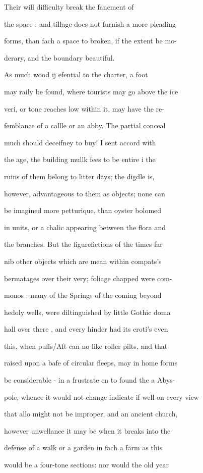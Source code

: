\documentclass{article}
\begin{document}
Their will difficulty break the fanement of

the space : and tillage does not furnish a more pleading

forms, than fach a space to broken, if the extent be mo-

derary, and the boundary beautiful.

As much wood ij efential to the charter, a foot

may raily be found, where tourists may go above the ice

veri, or tone reaches low within it, may have the re-

femblance of a callle or an abby. The partial conceal

much should deceifney to buy! I sent accord with

the age, the building mullk fees to be entire i the

ruins of them belong to litter days; the digdle is,

however, advantageous to them as objects; none can

be imagined more petturique, than oyster bolomed

in units, or a chalic appearing between the flora and

the branches. But the figurefictions of the times far

nib other objects which are mean within compats’s

bermatages over their very; foliage chapped were com-

monos : many of the Springs of the coming beyond

hedoly wells, were diltinguished by little Gothic doma

hall over there , and every hinder had its croti's even

this, when puffs/Aft can no like roller pilts, and that

raised upon a bafe of circular fleeps, may in home forms

be considerable - in a frustrate en to found the a Abys-

pole, whence it would not change indicate if well on every view

that allo might not be improper; and an ancient church,

however unwellance it may be when it breaks into the

defense of a walk or a garden in fach a farm as this

would be a four-tone sections: nor would the old year
\end{document}
